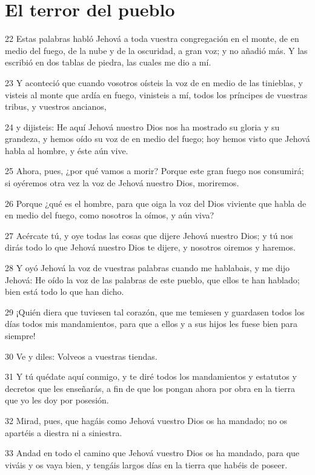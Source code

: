 \section{El terror del pueblo }

\par 22 Estas palabras habló Jehová a toda vuestra congregación en el monte, de en medio del fuego, de la nube y de la oscuridad, a gran voz; y no añadió más. Y las escribió en dos tablas de piedra, las cuales me dio a mí.
\par 23 Y aconteció que cuando vosotros oísteis la voz de en medio de las tinieblas, y visteis al monte que ardía en fuego, vinisteis a mí, todos los príncipes de vuestras tribus, y vuestros ancianos,
\par 24 y dijisteis: He aquí Jehová nuestro Dios nos ha mostrado su gloria y su grandeza, y hemos oído su voz de en medio del fuego; hoy hemos visto que Jehová habla al hombre, y éste aún vive.
\par 25 Ahora, pues, ¿por qué vamos a morir? Porque este gran fuego nos consumirá; si oyéremos otra vez la voz de Jehová nuestro Dios, moriremos.
\par 26 Porque ¿qué es el hombre, para que oiga la voz del Dios viviente que habla de en medio del fuego, como nosotros la oímos, y aún viva?
\par 27 Acércate tú, y oye todas las cosas que dijere Jehová nuestro Dios; y tú nos dirás todo lo que Jehová nuestro Dios te dijere, y nosotros oiremos y haremos.
\par 28 Y oyó Jehová la voz de vuestras palabras cuando me hablabais, y me dijo Jehová: He oído la voz de las palabras de este pueblo, que ellos te han hablado; bien está todo lo que han dicho.
\par 29 ¡Quién diera que tuviesen tal corazón, que me temiesen y guardasen todos los días todos mis mandamientos, para que a ellos y a sus hijos les fuese bien para siempre!
\par 30 Ve y diles: Volveos a vuestras tiendas.
\par 31 Y tú quédate aquí conmigo, y te diré todos los mandamientos y estatutos y decretos que les enseñarás, a fin de que los pongan ahora por obra en la tierra que yo les doy por posesión.
\par 32 Mirad, pues, que hagáis como Jehová vuestro Dios os ha mandado; no os apartéis a diestra ni a siniestra.
\par 33 Andad en todo el camino que Jehová vuestro Dios os ha mandado, para que viváis y os vaya bien, y tengáis largos días en la tierra que habéis de poseer.

